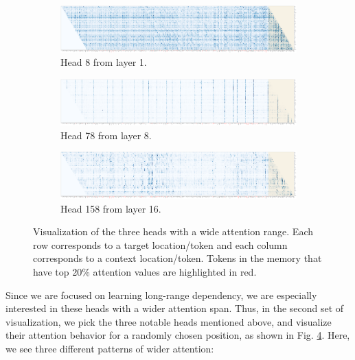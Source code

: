 \begin{figure}[!h]
	\begin{subfigure}[b]{\linewidth}
		\includegraphics[width=\textwidth]{FIG/abs-prob-H8-seg4.png}
		\caption{Head 8 from layer 1.}
		\label{fig:visattn-8}
	\end{subfigure}
	\begin{subfigure}[b]{\linewidth}
		\includegraphics[width=\textwidth]{FIG/abs-prob-H78-seg4.png}
		\caption{Head 78 from layer 8.}
		\label{fig:visattn-78}
	\end{subfigure}
	\begin{subfigure}[b]{\linewidth}
		\includegraphics[width=\textwidth]{FIG/abs-prob-H158-seg4.png}
		\caption{Head 158 from layer 16.}
		\label{fig:visattn-158}
	\end{subfigure}
	\caption{Visualization of the three heads with a wide attention range. Each row corresponds to a target location/token and each column corresponds to a context location/token. Tokens in the memory that have top 20\% attention values are highlighted in red.}
	\label{fig:visattn-pick}
\end{figure}
Since we are focused on learning long-range dependency, we are especially interested in these heads with a wider attention span.
Thus, in the second set of visualization, we pick the three notable heads mentioned above, and visualize their attention behavior for a randomly chosen position, as shown in Fig. \ref{fig:visattn-pick}.
Here, we see three different patterns of wider attention:
